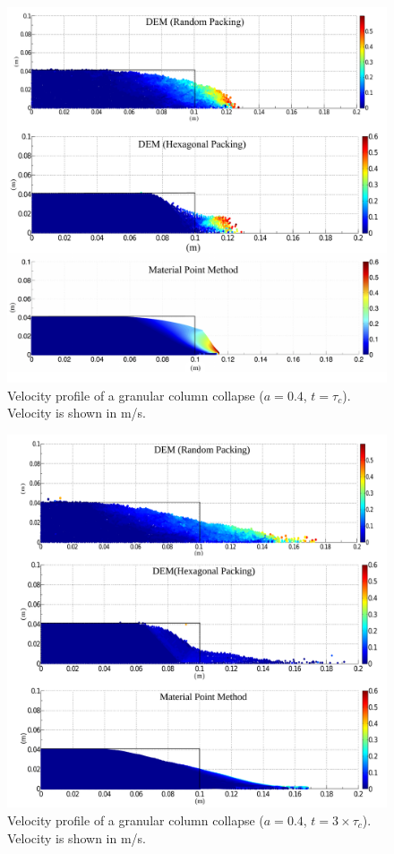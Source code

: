 \begin{figure}[tbhp]
\centering
\includegraphics[width=\textwidth]{a04tc}
\caption[Velocity profile of a granular column collapse ($a = 0.4$, 
$t=\tau_c$).]{Velocity profile of a granular column collapse ($a = 0.4$, 
$t=\tau_c$). Velocity is shown in m/s.}
\label{fig:a04tc}
\end{figure}

\begin{figure}[tbhp]
\centering
\includegraphics[width=\textwidth]{a04f}
\caption[Velocity profile of a granular column collapse ($a = 0.4$, 
$t=\tau_c$).]{Velocity profile of a granular column collapse ($a = 0.4$,  
$t=3\times\tau_c$). Velocity is shown in m/s.}
\label{fig:a04f}
\end{figure}


